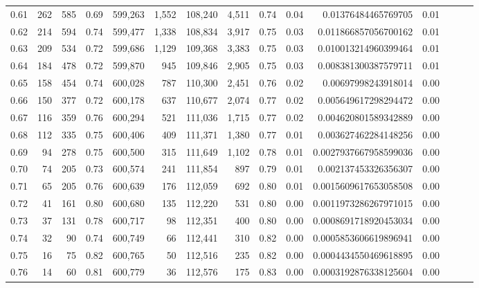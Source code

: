 \begin{tabular}{rrrrrrrrrrrrrrr}
0.61 &     262 &    585 &  0.69 &  599,263 &    1,552 &  108,240 &    4,511 &  0.74 &  0.04 &     0.01376484465769705 &      0.01 \\
0.62 &     214 &    594 &  0.74 &  599,477 &    1,338 &  108,834 &    3,917 &  0.75 &  0.03 &    0.011866857056700162 &      0.01 \\
0.63 &     209 &    534 &  0.72 &  599,686 &    1,129 &  109,368 &    3,383 &  0.75 &  0.03 &    0.010013214960399464 &      0.01 \\
0.64 &     184 &    478 &  0.72 &  599,870 &      945 &  109,846 &    2,905 &  0.75 &  0.03 &    0.008381300387579711 &      0.01 \\
0.65 &     158 &    454 &  0.74 &  600,028 &      787 &  110,300 &    2,451 &  0.76 &  0.02 &     0.00697998243918014 &      0.00 \\
0.66 &     150 &    377 &  0.72 &  600,178 &      637 &  110,677 &    2,074 &  0.77 &  0.02 &    0.005649617298294472 &      0.00 \\
0.67 &     116 &    359 &  0.76 &  600,294 &      521 &  111,036 &    1,715 &  0.77 &  0.02 &    0.004620801589342889 &      0.00 \\
0.68 &     112 &    335 &  0.75 &  600,406 &      409 &  111,371 &    1,380 &  0.77 &  0.01 &    0.003627462284148256 &      0.00 \\
0.69 &      94 &    278 &  0.75 &  600,500 &      315 &  111,649 &    1,102 &  0.78 &  0.01 &   0.0027937667958599036 &      0.00 \\
0.70 &      74 &    205 &  0.73 &  600,574 &      241 &  111,854 &      897 &  0.79 &  0.01 &    0.002137453326356307 &      0.00 \\
0.71 &      65 &    205 &  0.76 &  600,639 &      176 &  112,059 &      692 &  0.80 &  0.01 &   0.0015609617653058508 &      0.00 \\
0.72 &      41 &    161 &  0.80 &  600,680 &      135 &  112,220 &      531 &  0.80 &  0.00 &   0.0011973286267971015 &      0.00 \\
0.73 &      37 &    131 &  0.78 &  600,717 &       98 &  112,351 &      400 &  0.80 &  0.00 &   0.0008691718920453034 &      0.00 \\
0.74 &      32 &     90 &  0.74 &  600,749 &       66 &  112,441 &      310 &  0.82 &  0.00 &   0.0005853606619896941 &      0.00 \\
0.75 &      16 &     75 &  0.82 &  600,765 &       50 &  112,516 &      235 &  0.82 &  0.00 &   0.0004434550469618895 &      0.00 \\
0.76 &      14 &     60 &  0.81 &  600,779 &       36 &  112,576 &      175 &  0.83 &  0.00 &   0.0003192876338125604 &      0.00 \\

\end{tabular}
